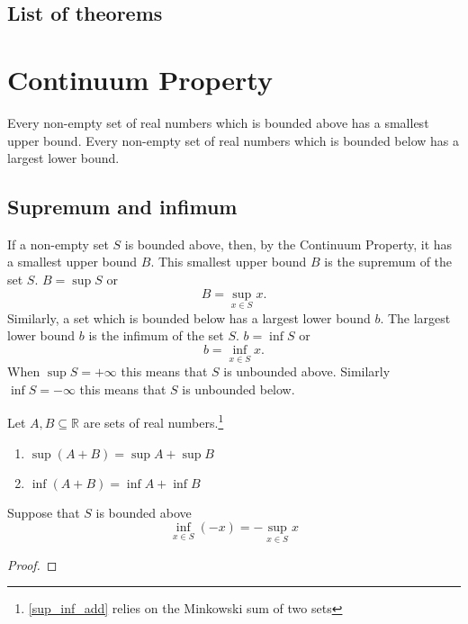 \documentclass[10pt, a4paper]{article}
\newcommand{\R}{\mathbb{R}}
\begin{document}
\newpage

\subsection{List of theorems}

\listoftheorems[ignoreall, onlynamed, title={}, swapnumber]

\newpage

\section{Continuum Property}
Every non-empty set of real numbers which is bounded above has a smallest upper bound. Every non-empty set of real numbers which is bounded below has a largest lower bound.

\subsection{Supremum and infimum}
If a non-empty set $S$ is bounded above, then, by the Continuum Property, it has a smallest upper bound $B$. This smallest upper bound $B$ is the supremum of the set $S$. $B = \sup{S}$ or \\ $$B = \sup_{x \in S}{x}.$$
Similarly, a set which is bounded below has a largest lower bound $b$. The largest lower bound $b$ is the infimum of the set $S$. $b = \inf{S}$ or $$b = \inf_{x \in S}{x}.$$
When $\sup{S} = +\infty$ this means that $S$ is unbounded above. Similarly $\inf{S} = -\infty$ this means that $S$ is unbounded below.

\begin{theorem}\label{sup_inf_add}
    Let $A, B \subseteq \R$ are sets of real numbers.\footnote{\autoref{sup_inf_add} relies on the Minkowski sum of two sets}
    \begin{enumerate}[label = (\alph*)]
        \item $\sup{(A + B)} = \sup{A} + \sup{B}$
        \item $\inf{(A + B)} = \inf{A} + \inf{B}$
    \end{enumerate}
\end{theorem}

\begin{theorem}
    Suppose that $S$ is bounded above $$\inf_{x \in S}{(-x)} = -\sup_{x \in S}{x}$$
    \begin{proof}
        
    \end{proof}
\end{theorem}
\end{document}
